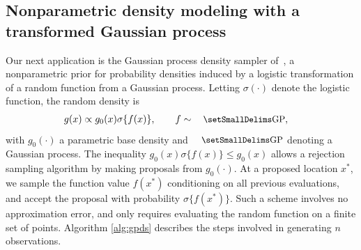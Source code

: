 \subsection{Nonparametric density modeling with a transformed Gaussian process}
Our next application is the Gaussian process density sampler of~\cite{adams_gpds},
a nonparametric prior for probability densities induced by a logistic transformation of a random function from a Gaussian process.  
Letting $\sigma(\cdot)$ denote the logistic function, the random density is 
\begin{align}
g(x) &\propto g_0(x) \sigma\{f(x)\},\qquad
f \sim  \mbox{\small{GP}}, \nonumber 
\end{align}
with $g_0(\cdot)$ a parametric base density and $\mbox{\small{GP}}$ denoting a Gaussian process.
The inequality
$g_0(x) \sigma\{f(x)\} \le g_0(x)$
allows a rejection sampling algorithm %
by making proposals from $g_0(\cdot)$.
At a proposed location $x^*$, we sample the function value $f(x^*)$ conditioning on 
all previous evaluations, and accept the proposal with probability 
$\sigma\{f(x^*)\}$.  Such a scheme involves no approximation error, and only requires evaluating the random function on a finite set of points.
Algorithm \ref{alg:gpds} describes the steps involved in generating $n$ observations.

